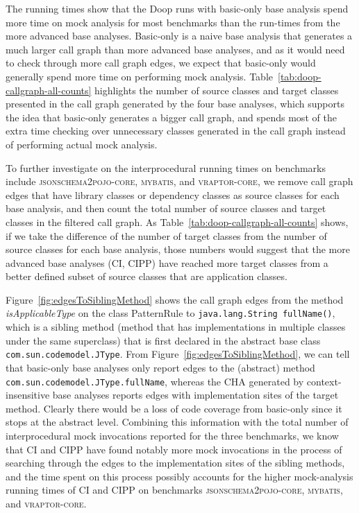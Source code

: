 The running times show that the Doop runs with basic-only base analysis spend more time on mock analysis for most benchmarks than the run-times from the more advanced base analyses. Basic-only is a naive base analysis that generates a much larger call graph than more advanced base analyses, and as it would need to check through more call graph edges, we expect that basic-only would generally spend more time on performing mock analysis. Table~\ref{tab:doop-callgraph-all-counts} highlights the number of source classes and target classes presented in the call graph generated by the four base analyses, which supports the idea that basic-only generates a bigger call graph, and spends most of the extra time checking over unnecessary classes generated in the call graph instead of performing actual mock analysis.

To further investigate on the interprocedural running times on benchmarks include \textsc{jsonschema2pojo-core}, \textsc{mybatis}, and \textsc{vraptor-core}, we remove call graph edges that have library classes or dependency classes as source classes for each base analysis, and then count the total number of source classes and target classes in the filtered call graph. As Table~\ref{tab:doop-callgraph-all-counts} shows, if we take the difference of the number of target classes from the number of source classes for each base analysis, those numbers would suggest that the more advanced base analyses (CI, CIPP) have reached more target classes from a better defined subset of source classes that are application classes. 

Figure~\ref{fig:edgesToSiblingMethod} shows the call graph edges from the method \textit{isApplicableType} on the class PatternRule to \texttt{java.lang.String fullName()}, which is a sibling method (method that has implementations in multiple classes under the same superclass) that is first declared in the abstract base class \texttt{com.sun.codemodel.JType}. From Figure~\ref{fig:edgesToSiblingMethod}, we can tell that basic-only base analyses only report edges to the (abstract) method \\ \texttt{com.sun.codemodel.JType.fullName}, whereas the CHA generated by context-insensitive base analyses reports edges with implementation sites of the target method. Clearly there would be a loss of code coverage from basic-only since it stops at the abstract level. Combining this information with the total number of interprocedural mock invocations reported for the three benchmarks, we know that CI and CIPP have found notably more mock invocations in the process of searching through the edges to the implementation sites of the sibling methods, and the time spent on this process possibly accounts for the higher mock-analysis running times of CI and CIPP on benchmarks \textsc{jsonschema2pojo-core}, \textsc{mybatis}, and \textsc{vraptor-core}.

